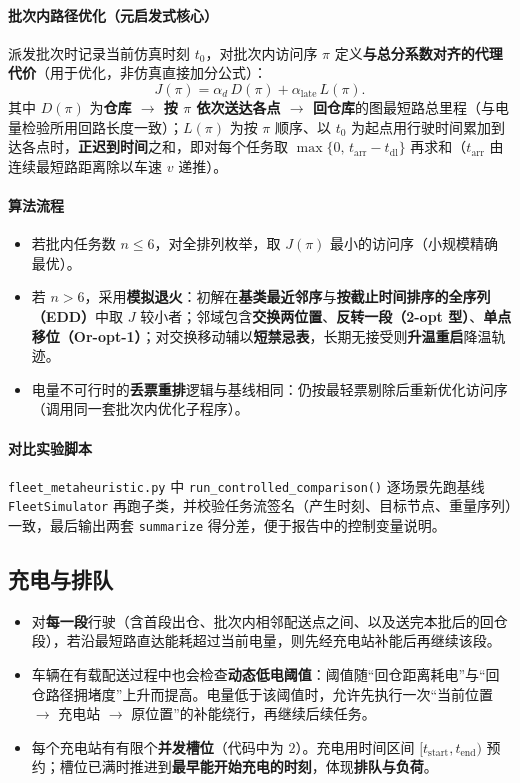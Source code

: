 \documentclass[UTF8,a4paper]{ctexart}
\begin{document}
\paragraph{批次内路径优化（元启发式核心）}
派发批次时记录当前仿真时刻 $t_0$，对批次内访问序 $\pi$ 定义\textbf{与总分系数对齐的代理代价}（用于优化，非仿真直接加分公式）：
\begin{equation}
  J(\pi) = \alpha_{d}\, D(\pi) + \alpha_{\mathrm{late}}\, L(\pi).
\end{equation}
其中 $D(\pi)$ 为\textbf{仓库 $\to$ 按 $\pi$ 依次送达各点 $\to$ 回仓库}的图最短路总里程（与电量检验所用回路长度一致）；$L(\pi)$ 为按 $\pi$ 顺序、以 $t_0$ 为起点用行驶时间累加到达各点时，\textbf{正迟到时间}之和，即对每个任务取 $\max\{0,\,t_{\mathrm{arr}}-t_{\mathrm{dl}}\}$ 再求和（$t_{\mathrm{arr}}$ 由连续最短路距离除以车速 $v$ 递推）。

\paragraph{算法流程}
\begin{itemize}
  \item 若批内任务数 $n\le 6$，对全排列枚举，取 $J(\pi)$ 最小的访问序（小规模精确最优）。
  \item 若 $n>6$，采用\textbf{模拟退火}：初解在\textbf{基类最近邻序}与\textbf{按截止时间排序的全序列（EDD）}中取 $J$ 较小者；邻域包含\textbf{交换两位置}、\textbf{反转一段（2-opt 型）}、\textbf{单点移位（Or-opt-1）}；对交换移动辅以\textbf{短禁忌表}，长期无接受则\textbf{升温重启}降温轨迹。
  \item 电量不可行时的\textbf{丢票重排}逻辑与基线相同：仍按最轻票剔除后重新优化访问序（调用同一套批次内优化子程序）。
\end{itemize}

\paragraph{对比实验脚本}
\texttt{fleet\_metaheuristic.py} 中 \texttt{run\_controlled\_comparison()} 逐场景先跑基线 \texttt{FleetSimulator} 再跑子类，并校验任务流签名（产生时刻、目标节点、重量序列）一致，最后输出两套 \texttt{summarize} 得分差，便于报告中的控制变量说明。

\subsection{充电与排队}
\begin{itemize}
  \item 对\textbf{每一段}行驶（含首段出仓、批次内相邻配送点之间、以及送完本批后的回仓段），若沿最短路直达能耗超过当前电量，则先经充电站补能后再继续该段。
  \item 车辆在有载配送过程中也会检查\textbf{动态低电阈值}：阈值随“回仓距离耗电”与“回仓路径拥堵度”上升而提高。电量低于该阈值时，允许先执行一次“当前位置 $\to$ 充电站 $\to$ 原位置”的补能绕行，再继续后续任务。
  \item 每个充电站有有限个\textbf{并发槽位}（代码中为 $2$）。充电用时间区间 $[t_{\mathrm{start}},t_{\mathrm{end}})$ 预约；槽位已满时推进到\textbf{最早能开始充电的时刻}，体现\textbf{排队与负荷}。
\end{itemize}
\end{document}
